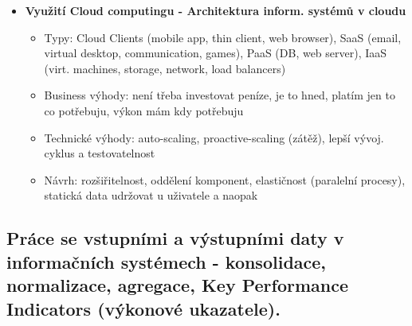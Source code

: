 \documentclass[a4paper,hidelinks]{article}
\begin{document}
\begin{itemize}
\begin{itemize}
\begin{itemize}
                \end{itemize}
        \end{itemize}
    \item \textbf{Využití Cloud computingu - Architektura inform. systémů v cloudu}
        \begin{itemize}
            \item Typy: Cloud Clients (mobile app, thin client, web browser), SaaS (email, virtual desktop, communication, games), PaaS (DB, web server), IaaS (virt. machines, storage, network, load balancers)
            \item Business výhody: není třeba investovat peníze, je to hned, platím jen to co potřebuju, výkon mám kdy potřebuju
            \item Technické výhody: auto-scaling, proactive-scaling (zátěž), lepší vývoj. cyklus a testovatelnost
            \item Návrh: rozšiřitelnost, oddělení komponent, elastičnost (paralelní procesy), statická data udržovat u uživatele a naopak
        \end{itemize}
\end{itemize}

\subsection{Práce se vstupními a výstupními daty v informačních systémech - konsolidace, normalizace, agregace, Key Performance Indicators (výkonové ukazatele).}
\end{document}
